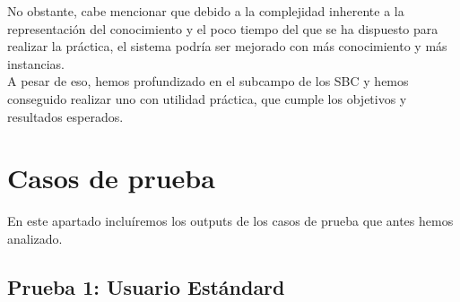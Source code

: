 \documentclass[11]{article}
\begin{document}
No obstante, cabe mencionar que debido a la complejidad inherente a la representación del conocimiento y el poco tiempo del que se ha dispuesto para realizar la práctica, el sistema podría ser mejorado con más conocimiento y más instancias. 
\\

A pesar de eso, hemos profundizado en el subcampo de los SBC y hemos conseguido realizar uno con utilidad práctica, que cumple los objetivos y resultados esperados.

\newpage
\appendix
\appendixpage
\addappheadtotoc
\section{Casos de prueba}
En este apartado incluíremos los outputs de los casos de prueba que antes hemos analizado.

\subsection{Prueba 1: Usuario Estándard}
\end{document}

